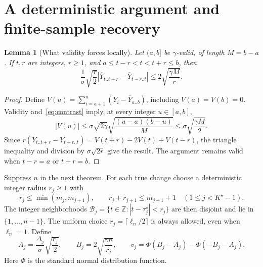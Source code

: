 \documentclass[pdflatex,sn-mathphys-num]{sn-jnl}
\newcommand{\Z}{\mathbb Z}
\newcommand{\taus}{\tau^\star}
\theoremstyle{thmstyleone}
\newtheorem{lemma}[theorem]{Lemma}
\theoremstyle{thmstyletwo}
\begin{document}
\section{A deterministic argument and finite-sample recovery}\label{sec:finite}

\begin{lemma}[What validity forces locally]\label{lem:local}
Let $(a,b]$ be $\gamma$-valid, of length $M=b-a$. If $t,r$ are integers,
$r\ge1$, and $a\le t-r<t<t+r\le b$, then
\begin{equation}\label{eq:local-constraint}
\frac{1}{\sigma}\sqrt{\frac r2}
  |\overline Y_{t..t+r}-\overline Y_{t-r..t}|
\le2\sqrt{\frac{\gamma M}{r}}.
\end{equation}
\end{lemma}
\begin{proof}
Define $V(u)=\sum_{i=a+1}^u(Y_i-\overline Y_{a..b})$, including $V(a)=V(b)=0$.
Validity and~\eqref{eq:contrast} imply, at every integer $u\in[a,b]$,
\[
|V(u)|\le\sigma\sqrt{2\gamma}\sqrt{\frac{(u-a)(b-u)}{M}}
\le\sigma\sqrt{\frac{\gamma M}{2}}.
\]
Since
$r(\overline Y_{t..t+r}-\overline Y_{t-r..t})=V(t+r)-2V(t)+V(t-r)$,
the triangle inequality and division by $\sigma\sqrt{2r}$ give the result.
The argument remains valid when $t-r=a$ or $t+r=b$.
\end{proof}

Suppress $n$ in the next theorem. For each true change choose a deterministic
integer radius $r_j\ge1$ with
\begin{equation}\label{eq:radii}
r_j\le\min(m_j,m_{j+1}),\qquad
r_j+r_{j+1}\le m_{j+1}+1\quad(1\le j<K^\star-1).
\end{equation}
The integer neighborhoods $\mathcal B_j=\{t\in\Z:|t-\taus_j|<r_j\}$
are then disjoint and lie in $\{1,\ldots,n-1\}$.
The uniform choice $r_j=\lceil\ell_n/2\rceil$ is always allowed, even when
$\ell_n=1$. Define
\begin{equation}\label{eq:margin}
A_j=\frac{\Delta_j}{\sigma}\sqrt{\frac{r_j}{2}},\qquad
B_j=2\sqrt{\frac{\gamma n}{r_j}},\qquad
v_j=\Phi(B_j-A_j)-\Phi(-B_j-A_j).
\end{equation}
Here $\Phi$ is the standard normal distribution function.
\end{document}
